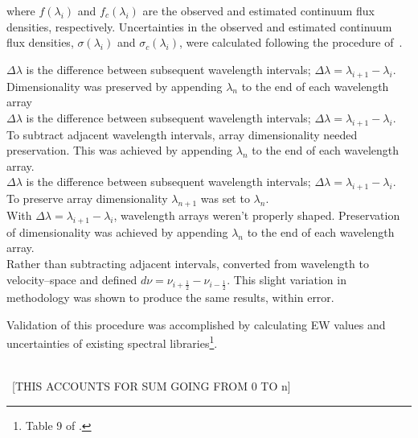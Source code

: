  where $f(\lambda_{i})$ and $f_{c}(\lambda_{i})$ are the observed 
and estimated continuum flux densities, respectively.  Uncertainties in the 
observed and estimated continuum flux densities, $\sigma(\lambda_{i})$ and 
$\sigma_{c}(\lambda_{i})$, were calculated following the procedure 
of~\cite{Sembach_1992}.  


	 $\Delta\lambda$ is the difference between subsequent 
	wavelength intervals; $\Delta\lambda = \lambda_{i+1} - \lambda_{i}$.   
	Dimensionality was preserved by appending $\lambda_{n}$ to the end 
	of each wavelength array\\

	 $\Delta\lambda$ is the difference between subsequent 
	wavelength intervals; $\Delta\lambda = \lambda_{i+1} - \lambda_{i}$.   
	To subtract adjacent wavelength intervals, array dimensionality needed 
	preservation.  This was achieved by appending $\lambda_{n}$ to the end 
	of each wavelength array.\\

	 $\Delta\lambda$ is the difference between subsequent 
	wavelength intervals; $\Delta\lambda = \lambda_{i+1} - \lambda_{i}$.   
	To preserve array dimensionality $\lambda_{n+1}$ was set to $\lambda_{n}$.\\

	 With $\Delta\lambda = \lambda_{i+1} - \lambda_{i}$, wavelength 
	arrays weren't properly shaped.  Preservation of dimensionality was achieved 
	by appending $\lambda_{n}$ to the end of each wavelength array.\\


Rather than subtracting adjacent intervals, 
\cite{Sembach_1992} converted from wavelength to velocity--space and defined 
$d\nu = \nu_{i+\frac{1}{2}} - \nu_{i-\frac{1}{2}}$.  This slight variation in 
methodology was shown to produce the same results, within error.



Validation of this procedure was accomplished by calculating EW values and 
uncertainties of existing spectral libraries\footnote{Table 9 of \cite{Rayner_2009}.}.  



\noindent [CAN THIS BE EXPRESSED AS $\lambda_{i+1} - \lambda_{i} == \lambda_{i} - \lambda_{i-1}$]\\
~[THIS ACCOUNTS FOR SUM GOING FROM 0 TO n]





